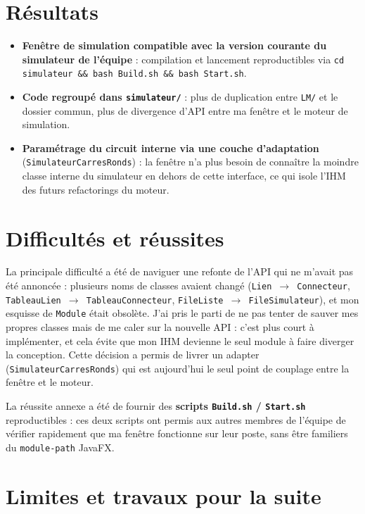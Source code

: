 \documentclass[11pt,a4paper]{article}
\begin{document}
\section*{R\'esultats}

\begin{itemize}
  \item \textbf{Fen\^etre de simulation compatible avec la version courante du simulateur de l'\'equipe} : compilation et lancement reproductibles via \texttt{cd simulateur \&\& bash Build.sh \&\& bash Start.sh}.
  \item \textbf{Code regroup\'e dans \texttt{simulateur/}} : plus de duplication entre \texttt{LM/} et le dossier commun, plus de divergence d'API entre ma fen\^etre et le moteur de simulation.
  \item \textbf{Param\'etrage du circuit interne via une couche d'adaptation} (\texttt{SimulateurCarresRonds}) : la fen\^etre n'a plus besoin de connaître la moindre classe interne du simulateur en dehors de cette interface, ce qui isole l'IHM des futurs refactorings du moteur.
\end{itemize}

\section*{Difficult\'es et r\'eussites}

La principale difficult\'e a \'et\'e de naviguer une refonte de l'API qui ne m'avait pas \'et\'e annonc\'ee : plusieurs noms de classes avaient chang\'e (\texttt{Lien~$\to$~Connecteur}, \texttt{TableauLien~$\to$~Tableau\-Connecteur}, \texttt{FileListe~$\to$~FileSimulateur}), et mon esquisse de \texttt{Module} \'etait obsol\`ete. J'ai pris le parti de ne pas tenter de sauver mes propres classes mais de me caler sur la nouvelle API : c'est plus court \`a impl\'ementer, et cela \'evite que mon IHM devienne le seul module \`a faire diverger la conception. Cette d\'ecision a permis de livrer un \og adapter \fg{} (\texttt{SimulateurCarresRonds}) qui est aujourd'hui le seul point de couplage entre la fen\^etre et le moteur.

La r\'eussite annexe a \'et\'e de fournir des \textbf{scripts \texttt{Build.sh} / \texttt{Start.sh}} reproductibles : ces deux scripts ont permis aux autres membres de l'\'equipe de v\'erifier rapidement que ma fen\^etre fonctionne sur leur poste, sans \^etre familiers du \texttt{module-path} JavaFX.

\section*{Limites et travaux pour la suite}
\end{document}
